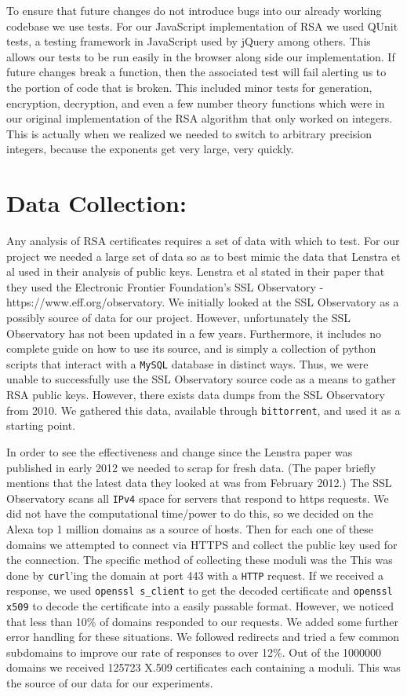 \documentclass[11pt,twoside]{article}
\newcommand{\ty}[1]{\texttt{#1}}
\begin{document}
\begin{multicols}{2}
To ensure that future changes do not introduce bugs into our already working
codebase we use tests. For our JavaScript implementation of RSA we used QUnit
tests, a testing framework in JavaScript used by jQuery among others. This
allows our tests to be run easily in the browser along side our implementation.
If future changes break a function, then the associated test will fail alerting
us to the portion of code that is broken.  
This included minor tests for generation, encryption, decryption, and
even a few number theory functions which were in our original implementation of
the RSA algorithm that only worked on integers. This is actually when we
realized we needed to switch to arbitrary precision integers, because the
exponents get very large, very quickly.

\section{Data Collection:}
Any analysis of RSA certificates requires a set of data with which to test. For
our project we needed a large set of data so as to best mimic the data that
Lenstra et al used in their analysis of public keys. Lenstra et al stated in 
their paper that they used the Electronic Frontier Foundation's SSL Observatory
- https://www.eff.org/observatory. We initially looked at the SSL Observatory as
a possibly source of data for our project. However, unfortunately the SSL
Observatory has not been updated in a few years. Furthermore, it includes no
complete guide on how to use its source, and is simply a collection of python
scripts that interact with a \ty{MySQL} database in distinct ways. Thus, we were
unable to successfully use the SSL Observatory source code as a means to gather
RSA public keys. However, there exists data dumps from the SSL Observatory from
2010. We gathered this data, available through \ty{bittorrent}, and used it as a
starting point.

In order to see the effectiveness and change since the Lenstra paper was
published in early 2012 we needed to scrap for fresh data. (The paper briefly
mentions that the latest data they looked at was from February 2012.) The SSL
Observatory scans all \ty{IPv4} space for servers that respond to https 
requests. We
did not have the computational time/power to do this, so we decided on the Alexa
top 1 million domains as a source of hosts. Then for each one of these domains
we attempted to connect via HTTPS and collect the public key used for the
connection. The specific method of collecting these moduli was the  This was
done by \ty{curl}'ing the domain at port 443 with a \ty{HTTP} request. If we 
received a
response, we used \ty{openssl s\_client} to get the decoded certificate and
\ty{openssl x509} to decode the certificate into a easily passable format.
However, we noticed that less than 10\% of domains responded to our requests. We
added some further error handling for these situations. We followed redirects
and tried a few common subdomains to improve our rate of responses to over 12\%.
Out of the 1000000 domains we received 125723 X.509 certificates each containing
a moduli. This was the source of our data for our experiments.


\end{multicols}
\end{document}
